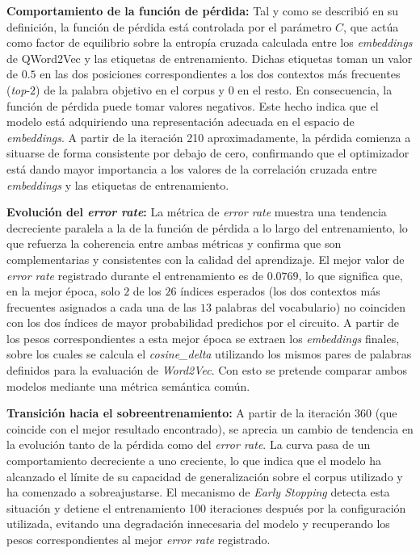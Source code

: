 \textbf{Comportamiento de la función de pérdida:} Tal y como se describió en su definición, la función de pérdida está controlada por el parámetro $C$, que actúa como factor de equilibrio sobre la entropía cruzada calculada entre los \textit{embeddings} de QWord2Vec y las etiquetas de entrenamiento. Dichas etiquetas toman un valor de $0.5$ en las dos posiciones correspondientes a los dos contextos más frecuentes (\textit{top}-$2$) de la palabra objetivo en el corpus y $0$ en el resto. En consecuencia, la función de pérdida puede tomar valores negativos. Este hecho indica que el modelo está adquiriendo una representación adecuada en el espacio de \textit{embeddings}. A partir de la iteración 210 aproximadamente, la pérdida comienza a situarse de forma consistente por debajo de cero, confirmando que el optimizador está dando mayor importancia a los valores de la correlación cruzada entre \textit{embeddings} y las etiquetas de entrenamiento.

\textbf{Evolución del \textit{error rate}:} La métrica de \textit{error rate} muestra una tendencia decreciente paralela a la de la función de pérdida a lo largo del entrenamiento, lo que refuerza la coherencia entre ambas métricas y confirma que son complementarias y consistentes con la calidad del aprendizaje. El mejor valor de \textit{error rate} registrado durante el entrenamiento es de $0.0769$, lo que significa que, en la mejor época, solo $2$ de los $26$ índices esperados (los dos contextos más frecuentes asignados a cada una de las $13$ palabras del vocabulario) no coinciden con los dos índices de mayor probabilidad predichos por el circuito. A partir de los pesos correspondientes a esta mejor época se extraen los \textit{embeddings} finales, sobre los cuales se calcula el \textit{cosine\_delta} utilizando los mismos pares de palabras definidos para la evaluación de \textit{Word2Vec}. Con esto se pretende comparar ambos modelos mediante una métrica semántica común.

\textbf{Transición hacia el sobreentrenamiento:} A partir de la iteración 360 (que coincide con el mejor resultado encontrado), se aprecia un cambio de tendencia en la evolución tanto de la pérdida como del \textit{error rate}. La curva pasa de un comportamiento decreciente a uno creciente, lo que indica que el modelo ha alcanzado el límite de su capacidad de generalización sobre el corpus utilizado y ha comenzado a sobreajustarse. El mecanismo de \textit{Early Stopping} detecta esta situación y detiene el entrenamiento 100 iteraciones después por la configuración utilizada, evitando una degradación innecesaria del modelo y recuperando los pesos correspondientes al mejor \textit{error rate} registrado.

